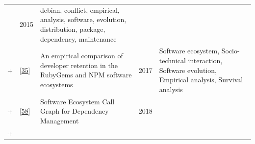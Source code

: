 \documentclass[]{book}
\begin{document}
\begin{longtable}[]{@{}lllll@{}}
\begin{minipage}[t]{0.34\columnwidth}
\end{minipage} & \begin{minipage}[t]{0.02\columnwidth}\raggedright\strut
2015\strut
\end{minipage} & \begin{minipage}[t]{0.39\columnwidth}\raggedright\strut
debian, conflict, empirical, analysis, software, evolution,
distribution, package, dependency, maintenance\strut
\end{minipage}\tabularnewline
\begin{minipage}[t]{0.01\columnwidth}\raggedright\strut
+\strut
\end{minipage} & \begin{minipage}[t]{0.09\columnwidth}\raggedright\strut
{[}\protect\hyperlink{ref-Constantinou2017}{35}{]}\strut
\end{minipage} & \begin{minipage}[t]{0.34\columnwidth}\raggedright\strut
An empirical comparison of developer retention in the RubyGems and NPM
software ecosystems\strut
\end{minipage} & \begin{minipage}[t]{0.02\columnwidth}\raggedright\strut
2017\strut
\end{minipage} & \begin{minipage}[t]{0.39\columnwidth}\raggedright\strut
Software ecosystem, Socio-technical interaction, Software evolution,
Empirical analysis, Survival analysis\strut
\end{minipage}\tabularnewline
\begin{minipage}[t]{0.01\columnwidth}\raggedright\strut
+\strut
\end{minipage} & \begin{minipage}[t]{0.09\columnwidth}\raggedright\strut
{[}\protect\hyperlink{ref-Hejderup2018}{58}{]}\strut
\end{minipage} & \begin{minipage}[t]{0.34\columnwidth}\raggedright\strut
Software Ecosystem Call Graph for Dependency Management\strut
\end{minipage} & \begin{minipage}[t]{0.02\columnwidth}\raggedright\strut
2018\strut
\end{minipage} & \begin{minipage}[t]{0.39\columnwidth}\raggedright\strut
\strut
\end{minipage}\tabularnewline
\begin{minipage}[t]{0.01\columnwidth}\raggedright\strut
+\strut
\end{minipage} & \begin{minipage}[t]{0.09\columnwidth}\raggedright\strut

\end{minipage}
\end{longtable}
\end{document}
